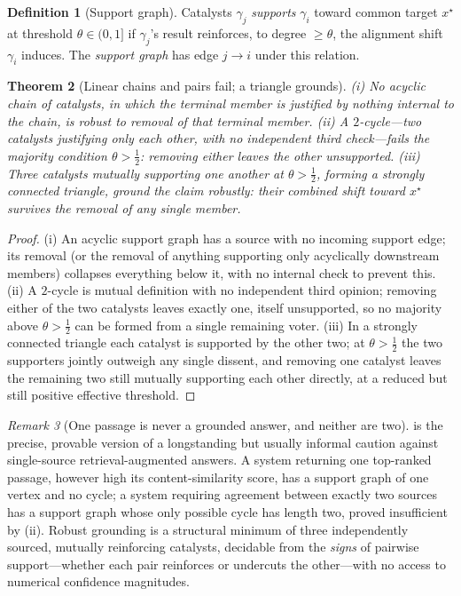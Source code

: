 \documentclass[11pt,twocolumn,a4paper]{article}
\theoremstyle{frathm}
\newtheorem{theorem}{Theorem}[section]
\theoremstyle{definition}
\newtheorem{definition}[theorem]{Definition}
\theoremstyle{remark}
\newtheorem{remark}[theorem]{Remark}
\begin{document}
\begin{definition}[Support graph]
\label{def:support}
Catalysts $\gamma_j$ \emph{supports} $\gamma_i$ toward common target
$x^{\star}$ at threshold $\theta\in(0,1]$ if $\gamma_j$'s result reinforces,
to degree $\ge\theta$, the alignment shift $\gamma_i$ induces. The
\emph{support graph} has edge $j\to i$ under this relation.
\end{definition}

\begin{theorem}[Linear chains and pairs fail; a triangle grounds]
\label{thm:triangle}
\textup{(i)} No acyclic chain of catalysts, in which the terminal member is
justified by nothing internal to the chain, is robust to removal of that
terminal member. \textup{(ii)} A $2$-cycle---two catalysts justifying only
each other, with no independent third check---fails the majority
condition $\theta>\tfrac12$: removing either leaves the other unsupported.
\textup{(iii)} Three catalysts mutually supporting one another at
$\theta>\tfrac12$, forming a strongly connected triangle, ground the claim
robustly: their combined shift toward $x^{\star}$ survives the removal of
any single member.
\end{theorem}

\begin{proof}
(i) An acyclic support graph has a source with no incoming support edge;
its removal (or the removal of anything supporting only acyclically
downstream members) collapses everything below it, with no internal check
to prevent this. (ii) A $2$-cycle is mutual definition with no
independent third opinion; removing either of the two catalysts leaves
exactly one, itself unsupported, so no majority above $\theta>\tfrac12$
can be formed from a single remaining voter. (iii) In a strongly connected
triangle each catalyst is supported by the other two; at $\theta>\tfrac12$
the two supporters jointly outweigh any single dissent, and removing one
catalyst leaves the remaining two still mutually supporting each other
directly, at a reduced but still positive effective threshold.
\end{proof}

\begin{remark}[One passage is never a grounded answer, and neither are
two]
\label{rem:one-two-never}
 is the precise, provable version of a longstanding
but usually informal caution against single-source retrieval-augmented
answers. A system returning one top-ranked passage, however high its
content-similarity score, has a support graph of one vertex and no
cycle; a system requiring agreement between exactly two sources has a
support graph whose only possible cycle has length two, proved
insufficient by (ii). Robust grounding is a
structural minimum of three independently sourced, mutually reinforcing
catalysts, decidable from the \emph{signs} of pairwise support---whether
each pair reinforces or undercuts the other---with no access to numerical
confidence magnitudes.
\end{remark}
\end{document}
